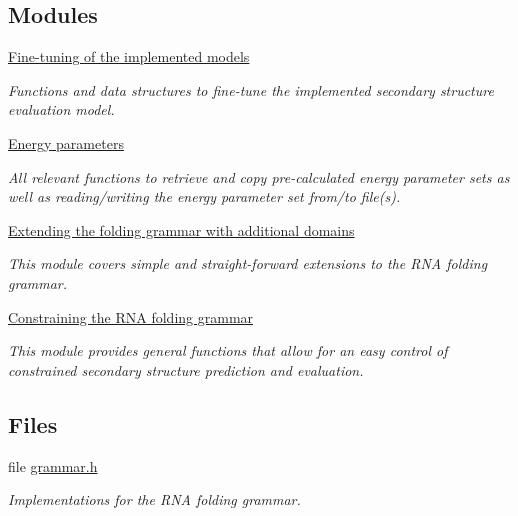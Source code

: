 \subsection*{Modules}
\begin{DoxyCompactItemize}
\item 
\hyperlink{group__model__details}{Fine-\/tuning of the implemented models}
\begin{DoxyCompactList}\small\item\em Functions and data structures to fine-\/tune the implemented secondary structure evaluation model. \end{DoxyCompactList}\item 
\hyperlink{group__energy__parameters}{Energy parameters}
\begin{DoxyCompactList}\small\item\em All relevant functions to retrieve and copy pre-\/calculated energy parameter sets as well as reading/writing the energy parameter set from/to file(s). \end{DoxyCompactList}\item 
\hyperlink{group__domains}{Extending the folding grammar with additional domains}
\begin{DoxyCompactList}\small\item\em This module covers simple and straight-\/forward extensions to the R\+NA folding grammar. \end{DoxyCompactList}\item 
\hyperlink{group__constraints}{Constraining the R\+N\+A folding grammar}
\begin{DoxyCompactList}\small\item\em This module provides general functions that allow for an easy control of constrained secondary structure prediction and evaluation. \end{DoxyCompactList}\end{DoxyCompactItemize}
\subsection*{Files}
\begin{DoxyCompactItemize}
\item 
file \hyperlink{grammar_8h}{grammar.\+h}
\begin{DoxyCompactList}\small\item\em Implementations for the R\+NA folding grammar. \end{DoxyCompactList}\end{DoxyCompactItemize}
